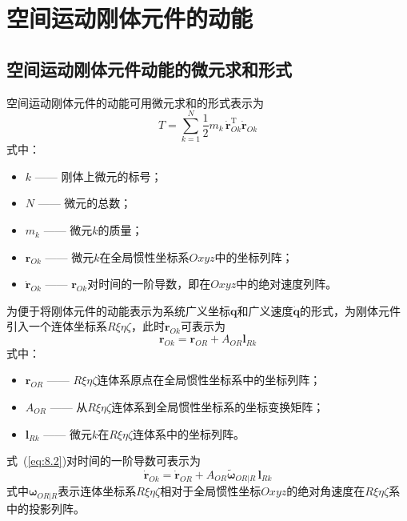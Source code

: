 \section{空间运动刚体元件的动能}

\subsection{空间运动刚体元件动能的微元求和形式}

空间运动刚体元件的动能可用微元求和的形式表示为
\begin{equation}
T = \sum_{k=1}^{N} \frac{1}{2}m_k\,\dot{\boldsymbol{r}}_{Ok}^{\mathrm{T}}\dot{\boldsymbol{r}}_{Ok}
\label{eq:8.1}
\end{equation}
式中：
\begin{itemize}
\item $k$ —— 刚体上微元的标号；
\item $N$ —— 微元的总数；
\item $m_k$ —— 微元$k$的质量；
\item $\boldsymbol{r}_{Ok}$ —— 微元$k$在全局惯性坐标系$Oxyz$中的坐标列阵；
\item $\dot{\boldsymbol{r}}_{Ok}$ —— $\boldsymbol{r}_{Ok}$对时间的一阶导数，即在$Oxyz$中的绝对速度列阵。
\end{itemize}

为便于将刚体元件的动能表示为系统广义坐标$\boldsymbol{q}$和广义速度$\dot{\boldsymbol{q}}$的形式，为刚体元件引入一个连体坐标系$R\xi\eta\zeta$，此时$\boldsymbol{r}_{Ok}$可表示为
\begin{equation}
\boldsymbol{r}_{Ok} = \boldsymbol{r}_{OR} + A_{OR}\boldsymbol{l}_{Rk}
\label{eq:8.2}
\end{equation}
式中：
\begin{itemize}
\item $\boldsymbol{r}_{OR}$ —— $R\xi\eta\zeta$连体系原点在全局惯性坐标系中的坐标列阵；
\item $A_{OR}$ —— 从$R\xi\eta\zeta$连体系到全局惯性坐标系的坐标变换矩阵；
\item $\boldsymbol{l}_{Rk}$ —— 微元$k$在$R\xi\eta\zeta$连体系中的坐标列阵。
\end{itemize}

式~(\ref{eq:8.2})对时间的一阶导数可表示为
\begin{equation}
\dot{\boldsymbol{r}}_{Ok} = \dot{\boldsymbol{r}}_{OR} + A_{OR}\tilde{\boldsymbol{\omega}}_{OR|R}\,\boldsymbol{l}_{Rk}
\label{eq:8.3}
\end{equation}
式中$\boldsymbol{\omega}_{OR|R}$表示连体坐标系$R\xi\eta\zeta$相对于全局惯性坐标$Oxyz$的绝对角速度在$R\xi\eta\zeta$系中的投影列阵。

